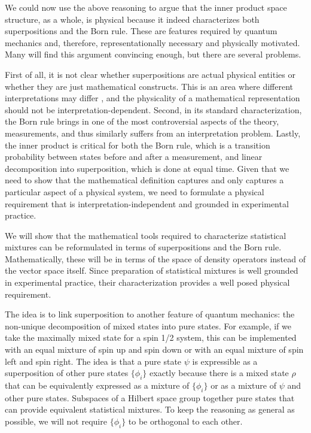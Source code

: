 \documentclass[10pt,twocolumn, nofootinbib]{revtex4-2}
\begin{document}
We could now use the above reasoning to argue that the inner product space structure, as a whole, is physical because it indeed characterizes both superpositions and the Born rule. These are features required by quantum mechanics and, therefore, representationally necessary and physically motivated. Many will find this argument convincing enough, but there are several problems.

First of all, it is not clear whether superpositions are actual physical entities or whether they are just mathematical constructs. This is an area where different interpretations may differ \cite{albert_quantum_1994, wallace_everett_2013, howard_complementarity_2021}, and the physicality of a mathematical representation should not be interpretation-dependent. Second, in its standard characterization, the Born rule brings in one of the most controversial aspects of the theory, measurements, and thus similarly suffers from an interpretation problem. Lastly, the inner product is critical for both the Born rule, which is a transition probability between states before and after a measurement, and linear decomposition into superposition, which is done at equal time. Given that we need to show that the mathematical definition captures and only captures a particular aspect of a physical system, we need to formulate a physical requirement that is interpretation-independent and grounded in experimental practice.

We will show that the mathematical tools required to characterize statistical mixtures can be reformulated in terms of superpositions and the Born rule. Mathematically, these will be in terms of the space of density operators instead of the vector space itself. Since preparation of statistical mixtures is well grounded in experimental practice, their characterization provides a well posed physical requirement.

The idea is to link superposition to another feature of quantum mechanics: the non-unique decomposition of mixed states into pure states. For example, if we take the maximally mixed state for a spin 1/2 system, this can be implemented with an equal mixture of spin up and spin down or with an equal mixture of spin left and spin right. The idea is that a pure state $\psi$ is expressible as a superposition of other pure states $\{\phi_i\}$ exactly because there is a mixed state $\rho$ that can be equivalently expressed as a mixture of $\{\phi_i\}$ or as a mixture of $\psi$ and other pure states. Subspaces of a Hilbert space group together pure states that can provide equivalent statistical mixtures. To keep the reasoning as general as possible, we will not require $\{\phi_i\}$ to be orthogonal to each other.
\end{document}
